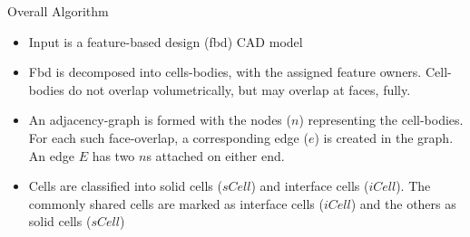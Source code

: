 \begin{frame}{Overall Algorithm}
\begin{itemize}[noitemsep,label=\textbullet,topsep=2pt,parsep=2pt,partopsep=2pt]
\item Input is a feature-based design (fbd) CAD model 
\item Fbd is decomposed into cells-bodies, with the assigned feature owners. Cell-bodies do not overlap volumetrically, but may overlap at faces, fully.
\item An adjacency-graph is formed with the nodes ($n$) representing the cell-bodies. For each such face-overlap, a corresponding edge ($e$) is created in the graph. An edge $E$ has two $n$s attached on either end.  
\item Cells are classified into solid cells ($sCell$) and interface cells ($iCell$).  The commonly shared cells are marked as interface cells ($iCell$) and the others as solid cells ($sCell$)
\vspace{-4mm}
\begin{figure}[!h]
\centering     %
{}
\end{figure}

\end{itemize}
\end{frame}


